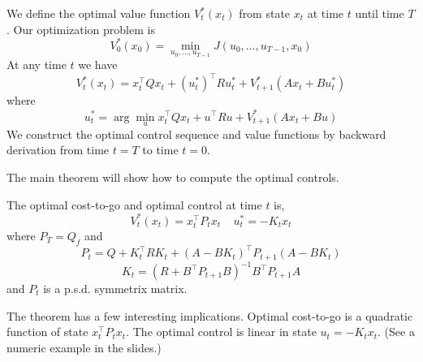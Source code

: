 We define the optimal value function $V^*_t(x_t)$ from state $x_t$
at time $t$ until time $T$. Our optimization problem is
\[
V^*_0(x_0)=\min_{u_0, \ldots, u_{T-1}} J(u_0, \ldots, u_{T-1},x_0)
\]
At any time $t$ we have
\[
V^*_t(x_t)=x_t^\top Qx_t +(u_t^*)^\top R u_t^*
+V^*_{t+1}(Ax_t+Bu_t^*)
\]
where
\[
u_t^*= \arg\min_u x_t^\top Qx_t +u^\top R u +V^*_{t+1}(Ax_t+Bu)
\]
We construct the optimal control sequence and value functions by
backward derivation from time $t=T$ to time $t=0$.

The main theorem will show how to compute the optimal controls.
\begin{theorem}
The optimal cost-to-go and optimal control at time $t$ is,
\[
V^*_t(x_t)=x_t^\top P_t x_t \;\;\;\; u_t^*=-K_t x_t
\]
where $P_T=Q_f$ and
\[
P_t=Q+K_t^\top RK_t +(A-BK_t)^\top P_{t+1} (A-BK_t)
\]
\[
K_t = (R+B^\top P_{t+1} B)^{-1}B^\top P_{t+1}A
\]
and $P_t$ is a p.s.d. symmetrix matrix.
\end{theorem}

The theorem has a few interesting implications. Optimal cost-to-go
is a quadratic function of state $x_t^\top P_t x_t$. The optimal
control is linear in state $u_t=-K_t x_t$. (See a numeric example in
the slides.)

